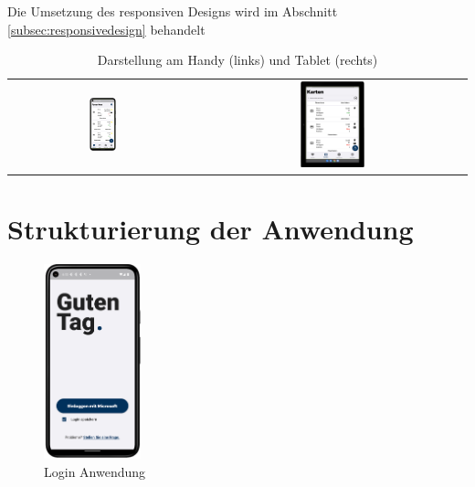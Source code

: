 Die Umsetzung des responsiven Designs wird im Abschnitt \ref{subsec:responsivedesign}  behandelt

\begin{table}[htbp]
  \centering
  \begin{tabular}{cc}
    \includegraphics[width=0.15\textwidth]{FLUTTER/images/GP/Client_Karten.png} &
    \includegraphics[width=0.25\textwidth]{FLUTTER/images/GP/client_responsive_tablet.png} \\
  \end{tabular}
  \label{tab:example}
  \captionsetup{type=figure}
\caption{Darstellung am Handy (links) und Tablet (rechts)}
\end{table}

\newpage

\section{Strukturierung der Anwendung}

\label{subsec:thero:login}

\begin{figure}
\centering
    \includegraphics[width=0.25\textwidth]{FLUTTER/images/GP/Login_Allg.png}
    \caption{Login Anwendung}
\end{figure}




